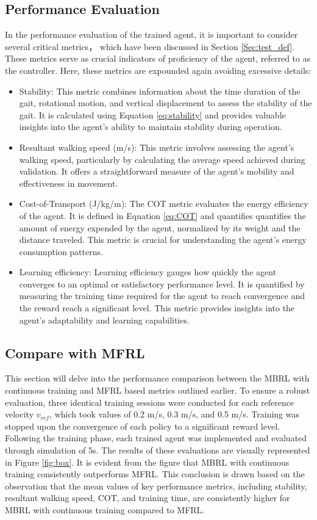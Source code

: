 \subsection{Performance Evaluation}
In the performance evaluation of the trained agent, it is important to consider several critical metrics， which have been discussed in Section \ref{Sec:test_def}. These metrics serve as crucial indicators of proficiency of the agent, referred to as the controller. Here, these metrics are expounded again avoiding excessive details:
\begin{itemize}
    \item Stability: This metric combines information about the time duration of the gait, rotational motion, and vertical displacement to assess the stability of the gait. It is calculated using Equation \ref{eq:stability} and provides valuable insights into the agent's ability to maintain stability during operation. 
    \item Resultant walking speed (m/s): This metric involves assessing the agent's walking speed, particularly by calculating the average speed achieved during validation. It offers a straightforward measure of the agent's mobility and effectiveness in movement.
    \item Cost-of-Transport (J/kg/m): The COT metric evaluates the energy efficiency of the agent. It is defined in Equation \ref{eq:COT} and quantifies quantifies the amount of energy expended by the agent, normalized by its weight and the distance traveled. This metric is crucial for understanding the agent's energy consumption patterns.
    \item Learning efficiency: Learning efficiency gauges how quickly the agent converges to an optimal or satisfactory performance level. It is quantified by measuring the training time required for the agent to reach convergence and the reward reach a significant level. This metric provides insights into the agent's adaptability and learning capabilities.
\end{itemize}

\subsection{Compare with MFRL}
This section will delve into the performance comparison between the MBRL with continuous training and MFRL based metrics outlined earlier. To ensure a robust evaluation, three identical training sessions were conducted for each reference velocity $v_{ref}$, which took values of 0.2 m/s, 0.3 m/s, and 0.5 m/s. Training was stopped upon the convergence of each policy to a significant reward level. Following the training phase, each trained agent was implemented and evaluated through simulation of 5s. The results of these evaluations are visually represented in Figure \ref{fig:box}. It is evident from the figure that MBRL with continuous training consistently outperforms MFRL. This conclusion is drawn based on the observation that the mean values of key performance metrics, including stability, resultant walking speed, COT, and training time, are consistently higher for MBRL with continuous training compared to MFRL. 

